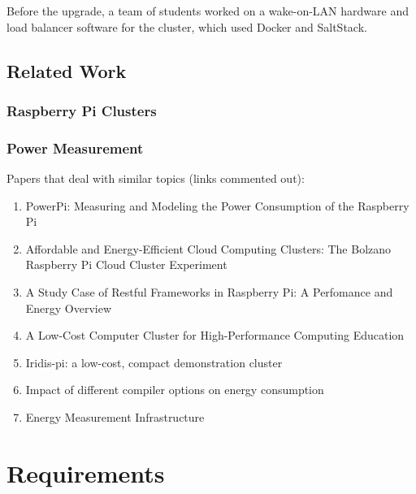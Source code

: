 \documentclass{l4proj}
\begin{document}
\noindent
Before the upgrade, a team of students worked on a wake-on-LAN hardware and load balancer software for the cluster, which used Docker and SaltStack.

\section{Related Work}
\subsection{Raspberry Pi Clusters}
\subsection{Power Measurement}
Papers that deal with similar topics (links commented out):
\begin{enumerate}
  \item PowerPi: Measuring and Modeling the Power Consumption of the Raspberry Pi %
  \item Affordable and Energy-Efficient Cloud Computing Clusters: The Bolzano Raspberry Pi Cloud Cluster Experiment %
  \item A Study Case of Restful Frameworks in Raspberry Pi: A Perfomance and Energy Overview %
  \item A Low-Cost Computer Cluster for High-Performance Computing Education %
  \item Iridis-pi: a low-cost, compact demonstration cluster %
  \item Impact of different compiler options on energy consumption %
  \item Energy Measurement Infrastructure %
\end{enumerate}

\chapter{Requirements}
\end{document}
